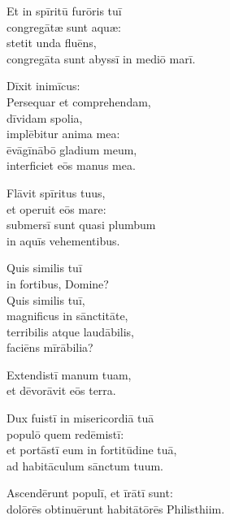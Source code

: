 \begin{flushleft}
{    Et in spīritū furōris tuī\\
    congregātæ sunt aquæ:\\
    stetit unda fluēns,\\
    congregāta sunt abyssī in mediō marī.

    Dīxit inimīcus:\\
    Persequar et comprehendam,\\
    dīvidam spolia,\\
    implēbitur anima mea:\\
    ēvāgīnābō gladium meum,\\
    interficiet eōs manus mea.

    Flāvit spīritus tuus,\\
    et operuit eōs mare:\\
    submersī sunt quasi plumbum\\
    in aquīs vehementibus.

    Quis similis tuī\\
    in fortibus, Domine?\\
    Quis similis tuī,\\
    magnificus in sānctitāte,\\
    terribilis atque laudābilis,\\
    faciēns mīrābilia? 
    
Extendistī manum tuam,\\
et dēvorāvit eōs terra.
    
    Dux fuistī in misericordiā tuā\\
    populō quem redēmistī:\\
    et portāstī eum in fortitūdine tuā,\\
    ad habitāculum sānctum tuum.

Ascendērunt populī, et īrātī sunt:\\
dolōrēs obtinuērunt habitātōrēs Philisthiim.

}
\end{flushleft}
